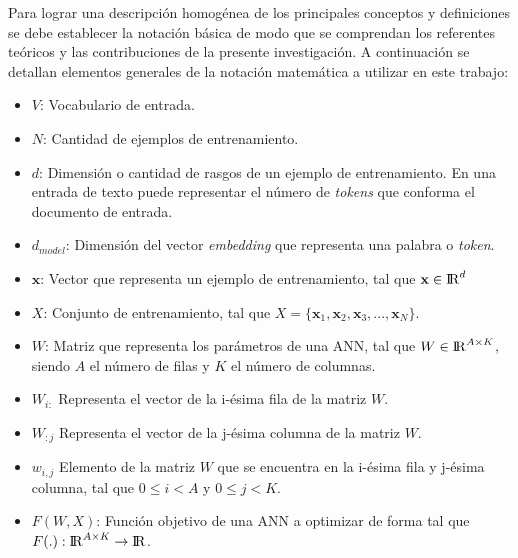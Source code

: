 \mathnotation
Para lograr una descripción homogénea de los principales conceptos y definiciones se debe establecer la notación básica de modo que se comprendan los referentes teóricos y las contribuciones de la presente investigación. A continuación se detallan elementos generales de la notación matemática a utilizar en este trabajo:

\begin{itemize}
	\item $V$: Vocabulario de entrada.
	\item $N$: Cantidad de ejemplos de entrenamiento.
	\item $d$: Dimensión o cantidad de rasgos de un ejemplo de entrenamiento. En una entrada de texto puede representar el número de \textit{tokens} que conforma el documento de entrada.
	\item $d_{model}$: Dimensión del vector \textit{embedding} que representa una palabra o \textit{token}.
	\item $\mathbf{x}$: Vector que representa un ejemplo de entrenamiento, tal que $\mathbf{x}\in {\rm I\!R}^{d}$
	\item $X$: Conjunto de entrenamiento, tal que $X=\{\mathbf{x}_1,\mathbf{x}_2,\mathbf{x}_3,..., \mathbf{x}_N\}$.
	\item $W$: Matriz que representa los parámetros de una ANN, tal que $W \in {\rm I\!R}^{A \times K}$, siendo $A$ el número de filas y $K$ el número de columnas.
	\item $W_{i:}$ Representa el vector de la i-ésima fila de la matriz $W$.
	\item $W_{:j}$ Representa el vector de la j-ésima columna de la matriz $W$.
	\item $w_{i,j}$ Elemento de la matriz $W$ que se encuentra en la i-ésima fila y j-ésima columna, tal que $0 \le i < A$ y $0 \le j < K$.
	\item $F(W,X)$: Función objetivo de una ANN a optimizar de forma tal que $F(.):{\rm I\!R}^{A \times K} \rightarrow {\rm I\!R}$.
\end{itemize}